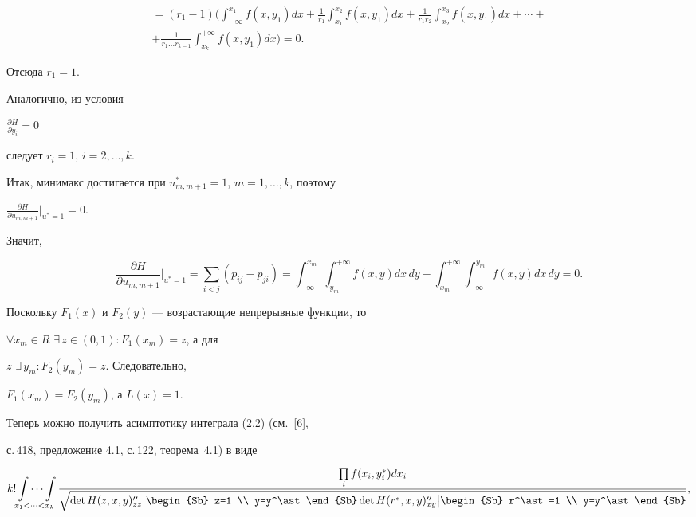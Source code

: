 \begin{pf}
\begin{multline*}
=(r_1-1)\bigg(\int_{-\infty}^{x_1}f(x,y_1)dx+


\frac{1}{r_1}\int_{x_1}^{x_2}f(x,y_1)dx+


\frac{1}{r_1r_2}\int_{x_2}^{x_3}f(x,y_1)dx+\dotsb +\\


%


+\frac{1}{r_1\dotsc r_{k-1}}\int_{x_k}^{+\infty}f(x,y_1)dx\bigg)=0.


\end{multline*}


Отсюда $r_1=1$.


Аналогично, из условия


$\frac{\partial H}{\partial y_i}=0$


следует $r_i=1$, $i=2,\dotsc ,k$.





Итак, минимакс достигается при $u_{m,m+1}^*=1$, $m=1,\dotsc ,k$, поэтому


$\frac{\partial H}{\partial u_{m,m+1}} \big|_{u^*=1}=0$.


Значит,


$$


\frac{\partial H}{\partial u_{m,m+1}} \bigg|_{u^*=1}=


\sum_{i<j}(p_{ij}-p_{ji})=\int_{-\infty}^{x_m}\int_{y_m}^{+\infty}


f(x,y)dx\,dy-\int_{x_m}^{+\infty}


\int_{-\infty}^{y_m} f(x,y)dx\,dy = 0.


$$


Поскольку $F_1(x)$ и $F_2(y)$ --- возрастающие непрерывные функции, то


$\forall x_m\in R$ $\exists\,z\in(0,1):F_1(x_m)=z$, а для


$z$\; $\exists\,y_m:F_2(y_m)=z$. Следовательно,


$F_1(x_m)=F_2(y_m)$, а $L(x)=1$.


\end{pf}





Теперь можно получить асимптотику интеграла (2.2) (см.~[6],


с.\,418, предложение 4.1, с.\,122, теорема~4.1) в виде


\begin{equation}


k! \idotsint\limits_{x_1<\dotsb <x_k}


\frac{


\prod\limits_i f(x_i,y_i^\ast)dx_i}


{


\sqrt{\det H(z,x,y)_{zz}''\big|\begin{Sb} z=1 \\ y=y^\ast\end{Sb}


\det H(r^\ast,x,y)_{xy}''\big|\begin{Sb} r^\ast=1 \\ y=y^\ast \end{Sb}}


},


\end{equation}


